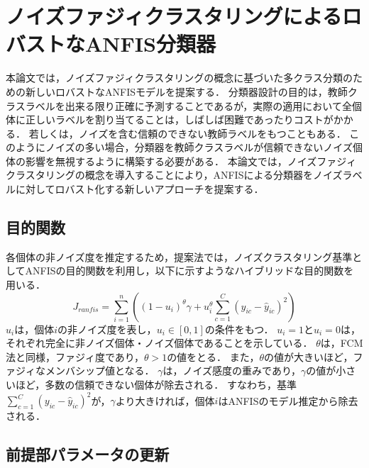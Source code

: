 \documentclass{ujarticle}
\begin{document}
\section{ノイズファジィクラスタリングによるロバストなANFIS分類器}

本論文では，ノイズファジィクラスタリングの概念に基づいた多クラス分類のための新しいロバストなANFISモデルを提案する．
分類器設計の目的は，教師クラスラベルを出来る限り正確に予測することであるが，実際の適用において全個体に正しいラベルを割り当てることは，しばしば困難であったりコストがかかる．
若しくは，ノイズを含む信頼のできない教師ラベルをもつこともある．
このようにノイズの多い場合，分類器を教師クラスラベルが信頼できないノイズ個体の影響を無視するように構築する必要がある．
本論文では，ノイズファジィクラスタリングの概念を導入することにより，ANFISによる分類器をノイズラベルに対してロバスト化する新しいアプローチを提案する．

\subsection{目的関数}

各個体の非ノイズ度を推定するため，提案法では，ノイズクラスタリング基準としてANFISの目的関数を利用し，以下に示すようなハイブリッドな目的関数を用いる．
%
\begin{equation}
	J_{ranfis} = \sum_{i=1}^n \left( (1-u_i)^\theta \gamma + u_i^\theta \sum_{c=1}^C (y_{ic} - \hat{y}_{ic})^2 \right)
\end{equation}
%
$u_i$は，個体$i$の非ノイズ度を表し，$u_i \in [0, 1]$の条件をもつ．
$u_i=1$と$u_i=0$は，それぞれ完全に非ノイズ個体・ノイズ個体であることを示している．
$\theta$は，FCM法と同様，ファジィ度であり，$\theta > 1$の値をとる．
また，$\theta$の値が大きいほど，ファジィなメンバシップ値となる．
$\gamma$は，ノイズ感度の重みであり，$\gamma$の値が小さいほど，多数の信頼できない個体が除去される．
すなわち，基準$\sum_{c=1}^C (y_{ic} - \hat{y}_{ic})^2$が，$\gamma$より大きければ，個体$i$はANFISのモデル推定から除去される．

\subsection{前提部パラメータの更新}
\end{document}
